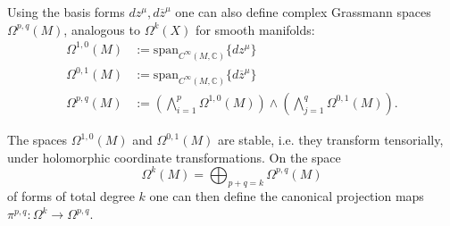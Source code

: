     Using the basis forms $dz^\mu,d\overline{z}^\mu$ one can also define complex Grassmann spaces $\Omega^{p,q}(M)$, analogous to $\Omega^k(X)$ for smooth manifolds:
    \begin{align}
        \Omega^{1,0}(M) &:= \mathrm{span}_{C^\infty(M,\mathbb{C})}\{dz^\mu\}\\
        \Omega^{0,1}(M) &:= \mathrm{span}_{C^\infty(M,\mathbb{C})}\{d\overline{z}^\mu\}\\
        \Omega^{p,q}(M) &:= \left(\bigwedge_{i=1}^p\Omega^{1,0}(M)\right)\wedge\left(\bigwedge_{j=1}^q\Omega^{0,1}(M)\right).
    \end{align}

    \begin{property}
        The spaces $\Omega^{1,0}(M)$ and $\Omega^{0,1}(M)$ are stable, i.e. they transform tensorially, under holomorphic coordinate transformations. On the space \[\Omega^k(M) = \bigoplus_{p+q=k}\Omega^{p,q}(M)\] of forms of total degree $k$ one can then define the canonical projection maps $\pi^{p,q}:\Omega^k\rightarrow\Omega^{p,q}$.
    \end{property}

